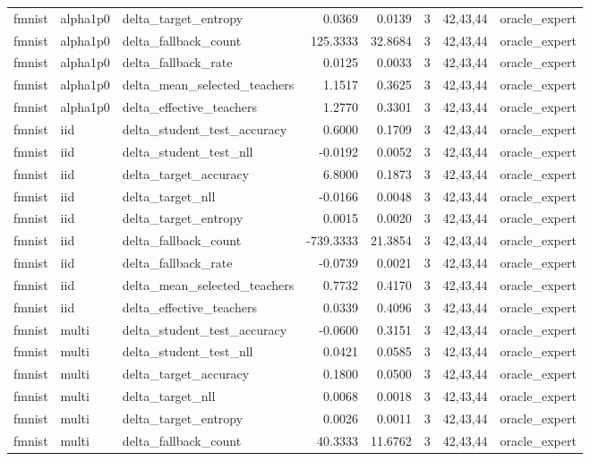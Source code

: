 \begin{tabular}{lllrrrll}
fmnist & alpha1p0 & delta\_target\_entropy & 0.0369 & 0.0139 & 3 & 42,43,44 & oracle\_expert \\
fmnist & alpha1p0 & delta\_fallback\_count & 125.3333 & 32.8684 & 3 & 42,43,44 & oracle\_expert \\
fmnist & alpha1p0 & delta\_fallback\_rate & 0.0125 & 0.0033 & 3 & 42,43,44 & oracle\_expert \\
fmnist & alpha1p0 & delta\_mean\_selected\_teachers & 1.1517 & 0.3625 & 3 & 42,43,44 & oracle\_expert \\
fmnist & alpha1p0 & delta\_effective\_teachers & 1.2770 & 0.3301 & 3 & 42,43,44 & oracle\_expert \\
fmnist & iid & delta\_student\_test\_accuracy & 0.6000 & 0.1709 & 3 & 42,43,44 & oracle\_expert \\
fmnist & iid & delta\_student\_test\_nll & -0.0192 & 0.0052 & 3 & 42,43,44 & oracle\_expert \\
fmnist & iid & delta\_target\_accuracy & 6.8000 & 0.1873 & 3 & 42,43,44 & oracle\_expert \\
fmnist & iid & delta\_target\_nll & -0.0166 & 0.0048 & 3 & 42,43,44 & oracle\_expert \\
fmnist & iid & delta\_target\_entropy & 0.0015 & 0.0020 & 3 & 42,43,44 & oracle\_expert \\
fmnist & iid & delta\_fallback\_count & -739.3333 & 21.3854 & 3 & 42,43,44 & oracle\_expert \\
fmnist & iid & delta\_fallback\_rate & -0.0739 & 0.0021 & 3 & 42,43,44 & oracle\_expert \\
fmnist & iid & delta\_mean\_selected\_teachers & 0.7732 & 0.4170 & 3 & 42,43,44 & oracle\_expert \\
fmnist & iid & delta\_effective\_teachers & 0.0339 & 0.4096 & 3 & 42,43,44 & oracle\_expert \\
fmnist & multi & delta\_student\_test\_accuracy & -0.0600 & 0.3151 & 3 & 42,43,44 & oracle\_expert \\
fmnist & multi & delta\_student\_test\_nll & 0.0421 & 0.0585 & 3 & 42,43,44 & oracle\_expert \\
fmnist & multi & delta\_target\_accuracy & 0.1800 & 0.0500 & 3 & 42,43,44 & oracle\_expert \\
fmnist & multi & delta\_target\_nll & 0.0068 & 0.0018 & 3 & 42,43,44 & oracle\_expert \\
fmnist & multi & delta\_target\_entropy & 0.0026 & 0.0011 & 3 & 42,43,44 & oracle\_expert \\
fmnist & multi & delta\_fallback\_count & 40.3333 & 11.6762 & 3 & 42,43,44 & oracle\_expert \\

\end{tabular}
